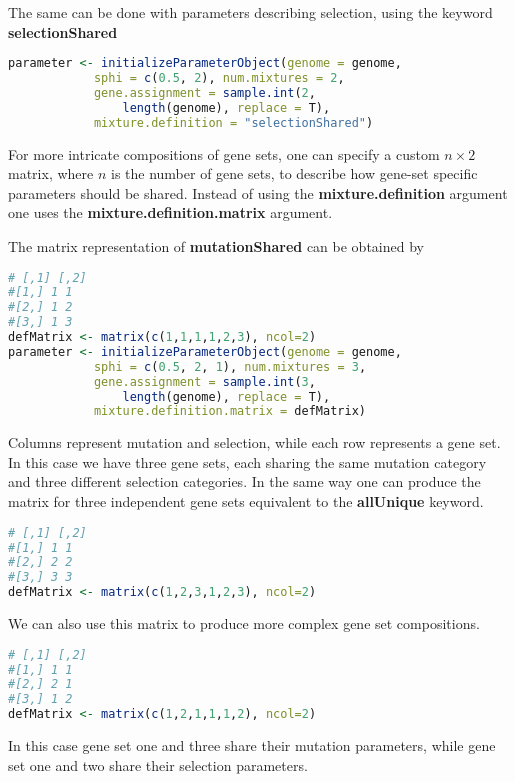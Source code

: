 The same can be done with parameters describing selection, using the keyword \textbf{selectionShared}

\begin{lstlisting}[language=R]
parameter <- initializeParameterObject(genome = genome, 
			sphi = c(0.5, 2), num.mixtures = 2,
			gene.assignment = sample.int(2, 
				length(genome), replace = T),
			mixture.definition = "selectionShared")
\end{lstlisting}

For more intricate compositions of gene sets, one can specify a custom $n \times 2$ matrix, where $n$ is the number of gene sets, to describe how gene-set specific parameters should be shared. 
Instead of using the \textbf{mixture.definition} argument one uses the \textbf{mixture.definition.matrix} argument.

The matrix representation of \textbf{mutationShared} can be obtained by

\begin{lstlisting}[language=R]
# [,1] [,2]
#[1,] 1 1
#[2,] 1 2
#[3,] 1 3
defMatrix <- matrix(c(1,1,1,1,2,3), ncol=2)
parameter <- initializeParameterObject(genome = genome, 
			sphi = c(0.5, 2, 1), num.mixtures = 3,
			gene.assignment = sample.int(3, 
				length(genome), replace = T),
			mixture.definition.matrix = defMatrix)
\end{lstlisting}

Columns represent mutation and selection, while each row represents a gene set. 
In this case we have three gene sets, each sharing the same mutation category and three different selection categories.
In the same way one can produce the matrix for three independent gene sets equivalent to the \textbf{allUnique} keyword.

\begin{lstlisting}[language=R]
# [,1] [,2]
#[1,] 1 1
#[2,] 2 2
#[3,] 3 3
defMatrix <- matrix(c(1,2,3,1,2,3), ncol=2)
\end{lstlisting}

We can also use this matrix to produce more complex gene set compositions.

\begin{lstlisting}[language=R]
# [,1] [,2]
#[1,] 1 1
#[2,] 2 1
#[3,] 1 2
defMatrix <- matrix(c(1,2,1,1,1,2), ncol=2)
\end{lstlisting}

In this case gene set one and three share their mutation parameters, while gene set one and two share their selection parameters.

